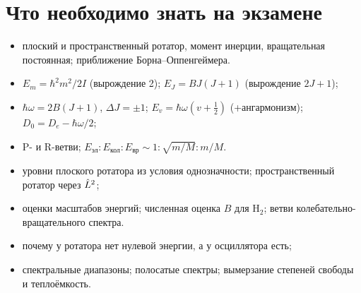 \section{Что необходимо знать на экзамене}

\begin{examcheck}
\begin{itemize}
 \item плоский и пространственный ротатор, момент инерции, вращательная постоянная; приближение Борна--Оппенгеймера.
\end{itemize}
\begin{itemize}
 \item $E_m=\hbar^2m^2/2I$ (вырождение 2); $E_J=BJ(J+1)$ (вырождение $2J+1$);
 \item $\hbar\omega=2B(J+1)$, $\Delta J=\pm1$; $E_v=\hbar\omega(v+\frac12)$ (+ангармонизм); $D_0=D_e-\hbar\omega/2$;
 \item P- и R-ветви; $E_{\text{эл}}:E_{\text{кол}}:E_{\text{вр}}\sim1:\sqrt{m/M}:m/M$.
\end{itemize}
\begin{itemize}
 \item уровни плоского ротатора из условия однозначности; пространственный ротатор через $\hat{L}^2$;
 \item оценки масштабов энергий; численная оценка $B$ для H$_2$; ветви колебательно-вращательного спектра.
\end{itemize}
\begin{itemize}
 \item почему у ротатора нет нулевой энергии, а у осциллятора есть;
 \item спектральные диапазоны; полосатые спектры; вымерзание степеней свободы и теплоёмкость.
\end{itemize}
\end{examcheck}
